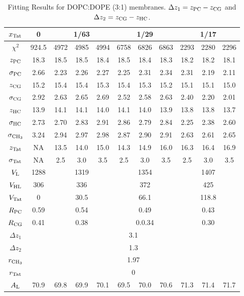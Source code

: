 \begin{table}[htbp]
  \centering
  \begin{tabular}{|c|c|c|c|c|c|c|c|c|c|c|}
    \hline
    $x_\textrm{Tat}$ & 0 & \multicolumn{3}{c|}{1/63} & \multicolumn{3}{c|}{1/29} & \multicolumn{3}{c|}{1/17} \\
    \hline
    $\chi^2$ & 924.5 & 4972 & 4985 & 4994 & 6758 & 6826 & 6863 & 2293 & 2280 & 2296 \\ 
    \hline
    $z_\textrm{PC}$ & 18.3 & 18.5 & 18.5 & 18.4 & 18.5 & 18.4 & 18.3 & 18.2 & 18.2 & 18.1 \\
    $\sigma_\textrm{PC}$ & 2.66 & 2.23 & 2.26 & 2.27 & 2.25 & 2.31 & 2.34 & 2.31 & 2.19 & 2.11 \\
    $z_\textrm{CG}$ & 15.2 & 15.4 & 15.4 & 15.3 & 15.4 & 15.3 & 15.2 & 15.1 & 15.1 & 15.0 \\
    $\sigma_\textrm{CG}$ & 2.92 & 2.63 & 2.65 & 2.69 & 2.52 & 2.58 & 2.63 & 2.40 & 2.20 & 2.01 \\
    $z_\textrm{HC}$ & 13.9 & 14.1 & 14.1 & 14.0 & 14.1 & 14.0 & 13.9 & 13.8 & 13.8 & 13.7 \\
    $\sigma_\textrm{HC}$ & 2.73 & 2.70 & 2.83 & 2.91 & 2.86 & 2.79 & 2.84 & 2.25 & 2.38 & 2.60 \\
    $\sigma_{\textrm{CH}_3}$ & 3.24 & 2.94 & 2.97 & 2.98 & 2.87 & 2.90 & 2.91 & 2.63 & 2.61 & 2.65 \\
    $z_\textrm{Tat}$ & NA & 13.5 & 14.0 & 15.0 & 14.3 & 14.9 & 16.0 & 16.3 & 16.4 & 16.9 \\
    $\sigma_\textrm{Tat}$ & NA & 2.5 & 3.0 & 3.5 & 2.5 & 3.0 & 3.5 & 2.5 & 3.0 & 3.5 \\ 
    \hline
    $V_\textrm{L}$ & 1288 & \multicolumn{3}{c|}{1319} & \multicolumn{3}{c|}{1354} & \multicolumn{3}{c|}{1407} \\ 
    $V_\textrm{HL}$ & 306 & \multicolumn{3}{c|}{336} & \multicolumn{3}{c|}{372} & \multicolumn{3}{c|}{425} \\
    $V_\textrm{Tat}$ & 0 & \multicolumn{3}{c|}{30.5} & \multicolumn{3}{c|}{66.1} & \multicolumn{3}{c|}{118.8} \\
    $R_\textrm{PC}$ & 0.59 & \multicolumn{3}{c|}{0.54} & \multicolumn{3}{c|}{0.49} & \multicolumn{3}{c|}{0.43} \\
    $R_\textrm{CG}$ & 0.41 & \multicolumn{3}{c|}{0.38} & \multicolumn{3}{c|}{0.0.34} & \multicolumn{3}{c|}{0.30} \\
    \hline
    $\Delta z_1$ & \multicolumn{10}{c|}{3.1} \\
    $\Delta z_2$ & \multicolumn{10}{c|}{1.3} \\
    $r_{\textrm{CH}_3}$ & \multicolumn{10}{c|}{1.97} \\
    $r_\textrm{Tat}$ & \multicolumn{10}{c|}{0} \\
    \hline
    $A_\textrm{L}$ & 70.9 & 69.8 & 69.9 & 70.1 & 69.5 & 70.0 & 70.6 & 71.3 & 71.4 & 71.7 \\
    \hline
  \end{tabular}
  \caption{Fitting Results for DOPC:DOPE (3:1) membranes. $\Delta z_1 = z_\textrm{PC}-z_\textrm{CG}$
  and $\Delta z_2 = z_\textrm{CG}-z_\textrm{HC}$.}
  \label{tb:DOPCDOPE3to1_fit_results}
\end{table}


